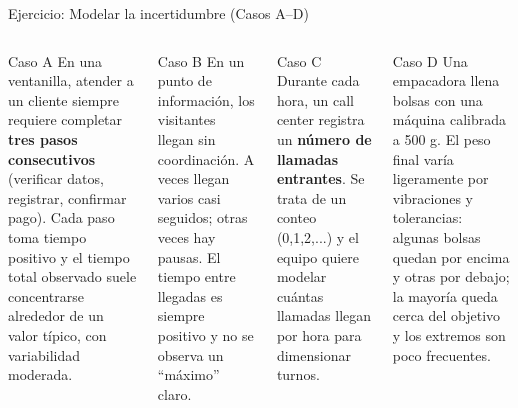 \documentclass[aspectratio=1610, 9pt]{beamer}
\begin{document}
\begin{frame}{Ejercicio: Modelar la incertidumbre (Casos A--D)}
\small
\begin{columns}[T]

\begin{block}{Caso A}
En una ventanilla, atender a un cliente siempre requiere completar \textbf{tres pasos consecutivos} (verificar datos, registrar, confirmar pago).  
Cada paso toma tiempo positivo y el tiempo total observado suele concentrarse alrededor de un valor típico, con variabilidad moderada.
\end{block}

\begin{block}{Caso B}
En un punto de información, los visitantes llegan sin coordinación.  
A veces llegan varios casi seguidos; otras veces hay pausas. El tiempo entre llegadas es siempre positivo y no se observa un “máximo” claro.
\end{block}


\begin{block}{Caso C}
Durante cada hora, un call center registra un \textbf{número de llamadas entrantes}.  
Se trata de un conteo (0,1,2,...) y el equipo quiere modelar cuántas llamadas llegan por hora para dimensionar turnos.
\end{block}

\begin{block}{Caso D}
Una empacadora llena bolsas con una máquina calibrada a 500 g.  
El peso final varía ligeramente por vibraciones y tolerancias: algunas bolsas quedan por encima y otras por debajo; la mayoría queda cerca del objetivo y los extremos son poco frecuentes.
\end{block}

\end{columns}
\end{frame}
\end{document}
